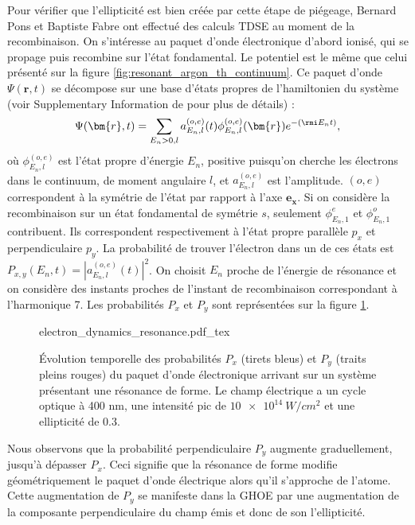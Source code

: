 Pour vérifier que l'ellipticité est bien créée par cette étape de piégeage, Bernard Pons et Baptiste Fabre ont effectué des calculs TDSE au moment de la recombinaison. On s'intéresse au paquet d'onde électronique d'abord ionisé, qui se propage puis recombine sur l'état fondamental. Le potentiel est le même que celui présenté sur la figure \ref{fig:resonant_argon_th_continuum}. Ce paquet d'onde $\Psi(\bm{r},t)$ se décompose sur une base d'états propres de l'hamiltonien du système (voir Supplementary Information de  pour plus de détails) :
\[ \Psi(\bm{r},t)=\sum_{E_n>0,l} a_{E_n,l}^{(o,e)}(t)\phi_{E_n,l}^{(o,e)}(\bm{r})e^{-(\rmi E_n t)},\]
où $\phi_{E_n,l}^{(o,e)}$ est l'état propre d'énergie $E_n$, positive puisqu'on cherche les électrons dans le continuum, de moment angulaire $l$, et $a_{E_n,l}^{(o,e)}$ est l'amplitude. $(o,e)$ correspondent à la symétrie de l'état par rapport à l'axe $\bm{e_x}$. Si on considère la recombinaison sur un état fondamental de symétrie $s$, seulement $\phi_{E_n,1}^{e}$ et $\phi_{E_n,1}^{o}$ contribuent. Ils correspondent respectivement à l'état propre parallèle $p_x$ et perpendiculaire $p_y$. La probabilité de trouver l'électron dans un de ces états est $P_{x,y}(E_n,t) = |a_{E_n,l}^{(o,e)}(t)|^2$. On choisit $E_n$ proche de l'énergie de résonance et on considère des instants proches de l'instant de recombinaison correspondant à l'harmonique 7. Les probabilités $P_x$ et $P_y$ sont représentées sur la figure \ref{fig:resonant_proba}.

\begin{figure}[!ht]
\centering
\def\svgwidth{1\columnwidth}
{electron_dynamics_resonance.pdf_tex}
\caption{\'{E}volution temporelle des probabilités $P_x$ (tirets bleus) et $P_y$ (traits pleins rouges) du paquet d'onde électronique arrivant sur un système présentant une résonance de forme. Le champ électrique a un cycle optique à 400 nm, une intensité pic de $\SI{10e14}{W/cm^2}$ et une ellipticité de 0.3.}
\label{fig:resonant_proba}
\end{figure}

Nous observons que la probabilité perpendiculaire $P_y$ augmente graduellement, jusqu'à dépasser $P_x$. Ceci signifie que la résonance de forme modifie géométriquement le paquet d'onde électrique alors qu'il s'approche de l'atome. Cette augmentation de $P_y$ se manifeste dans la GHOE par une augmentation de la composante perpendiculaire du champ émis et donc de son l'ellipticité.

